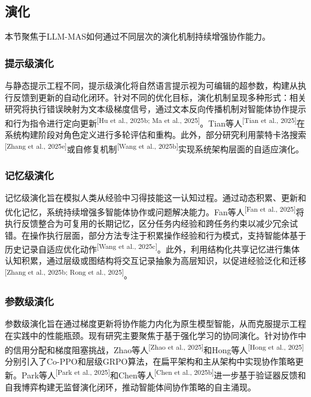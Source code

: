 \documentclass[UTF8,a4paper,12pt]{article}
\begin{document}
\subsection{演化}

本节聚焦于LLM-MAS如何通过不同层次的演化机制持续增强协作能力。

\subsubsection{提示级演化}

与静态提示工程不同，提示级演化将自然语言提示视为可编辑的超参数，构建从执行反馈到更新的自动化闭环。针对不同的优化目标，演化机制呈现多种形式：相关研究将执行错误映射为文本级梯度信号，通过文本反向传播机制对智能体协作提示和行为指令进行定向更新\textsuperscript{[Hu et al., 2025b; Ma et al., 2025]}。Tian等人\textsuperscript{[Tian et al., 2025]}在系统构建阶段对角色定义进行多轮评估和重构。此外，部分研究利用蒙特卡洛搜索\textsuperscript{[Zhang et al., 2025e]}或自修复机制\textsuperscript{[Wang et al., 2025b]}实现系统架构层面的自适应演化。

\subsubsection{记忆级演化}

记忆级演化旨在模拟人类从经验中习得技能这一认知过程。通过动态积累、更新和优化记忆，系统持续增强多智能体协作或问题解决能力。Fan等人\textsuperscript{[Fan et al., 2025]}将执行反馈整合为可复用的长期记忆，区分任务内经验和跨任务约束以减少冗余试错。在操作执行层面，部分方法专注于积累操作经验和行为模式，支持智能体基于历史记录自适应优化动作\textsuperscript{[Wang et al., 2025c]}。此外，利用结构化共享记忆进行集体认知积累，通过层级或图结构将交互记录抽象为高层知识，以促进经验泛化和迁移\textsuperscript{[Zhang et al., 2025b; Rong et al., 2025]}。

\subsubsection{参数级演化}

参数级演化旨在通过梯度更新将协作能力内化为原生模型智能，从而克服提示工程在实践中的性能瓶颈。现有研究主要聚焦于基于强化学习的协同演化。针对协作中的信用分配和梯度阻塞挑战，Zhao等人\textsuperscript{[Zhao et al., 2025]}和Hong等人\textsuperscript{[Hong et al., 2025]}分别引入了Co-PPO和层级GRPO算法，在扁平架构和主从架构中实现协作策略更新。Park等人\textsuperscript{[Park et al., 2025]}和Chen等人\textsuperscript{[Chen et al., 2025b]}进一步基于验证器反馈和自我博弈构建无监督演化闭环，推动智能体间协作策略的自主涌现。
\end{document}

